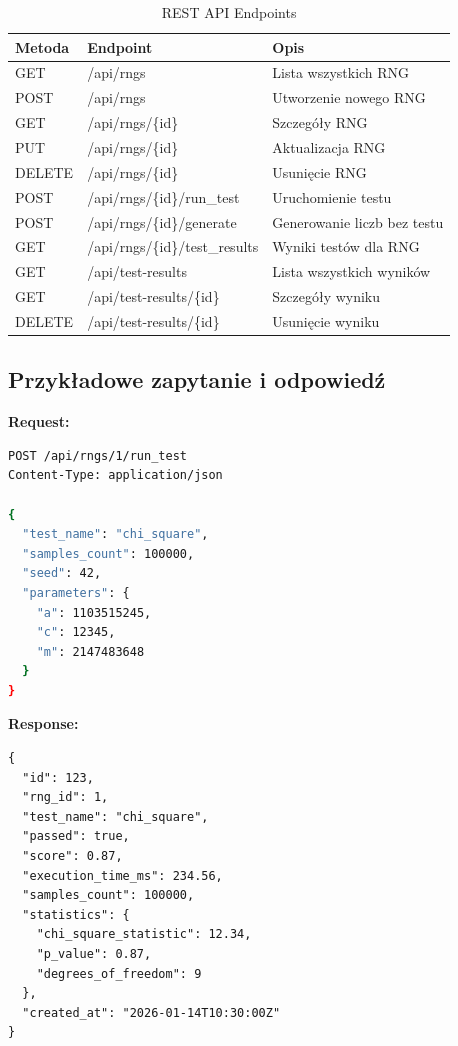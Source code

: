 \documentclass[12pt,a4paper]{article}
\begin{document}
\begin{table}[H]
\centering
\begin{tabular}{|l|l|p{6cm}|}
\hline
\textbf{Metoda} & \textbf{Endpoint} & \textbf{Opis} \\ \hline
GET & /api/rngs & Lista wszystkich RNG \\ \hline
POST & /api/rngs & Utworzenie nowego RNG \\ \hline
GET & /api/rngs/\{id\} & Szczegóły RNG \\ \hline
PUT & /api/rngs/\{id\} & Aktualizacja RNG \\ \hline
DELETE & /api/rngs/\{id\} & Usunięcie RNG \\ \hline
POST & /api/rngs/\{id\}/run\_test & Uruchomienie testu \\ \hline
POST & /api/rngs/\{id\}/generate & Generowanie liczb bez testu \\ \hline
GET & /api/rngs/\{id\}/test\_results & Wyniki testów dla RNG \\ \hline
GET & /api/test-results & Lista wszystkich wyników \\ \hline
GET & /api/test-results/\{id\} & Szczegóły wyniku \\ \hline
DELETE & /api/test-results/\{id\} & Usunięcie wyniku \\ \hline
\end{tabular}
\caption{REST API Endpoints}
\end{table}

\subsection{Przykładowe zapytanie i odpowiedź}

\textbf{Request:}
\begin{lstlisting}[language=bash]
POST /api/rngs/1/run_test
Content-Type: application/json

{
  "test_name": "chi_square",
  "samples_count": 100000,
  "seed": 42,
  "parameters": {
    "a": 1103515245,
    "c": 12345,
    "m": 2147483648
  }
}
\end{lstlisting}

\textbf{Response:}
\begin{lstlisting}[caption=JSON Response]
{
  "id": 123,
  "rng_id": 1,
  "test_name": "chi_square",
  "passed": true,
  "score": 0.87,
  "execution_time_ms": 234.56,
  "samples_count": 100000,
  "statistics": {
    "chi_square_statistic": 12.34,
    "p_value": 0.87,
    "degrees_of_freedom": 9
  },
  "created_at": "2026-01-14T10:30:00Z"
}
\end{lstlisting}
\end{document}
